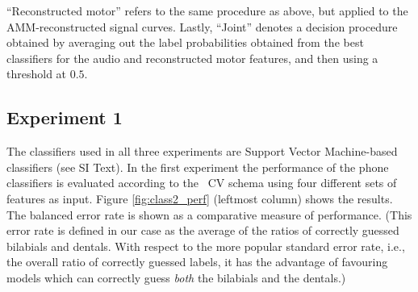 ``Reconstructed motor'' refers to the same procedure as above, but applied
to the AMM-reconstructed signal curves.
Lastly, ``Joint'' denotes a decision procedure obtained by averaging out the
label probabilities obtained from the best classifiers for the audio and
reconstructed motor features, and then using a threshold at $0.5$.


\subsection{Experiment 1}
\label{subsec:exp1}

The classifiers used in all three experiments are Support Vector Machine-based classifiers 
\cite{BGV92} (see SI Text).
In the first experiment the performance of the phone classifiers is evaluated
according to the \overall\ CV schema using four different sets of features as
input. Figure \ref{fig:class2_perf} (leftmost column) shows the results. The balanced error rate
is shown as a comparative measure of performance. (This error rate is defined in
our case as the average of the ratios of correctly guessed bilabials and dentals.
With respect to the more popular standard error rate, i.e., the overall ratio of correctly
guessed labels, it has the advantage of favouring models which can correctly guess
\emph{both} the bilabials and the dentals.)


